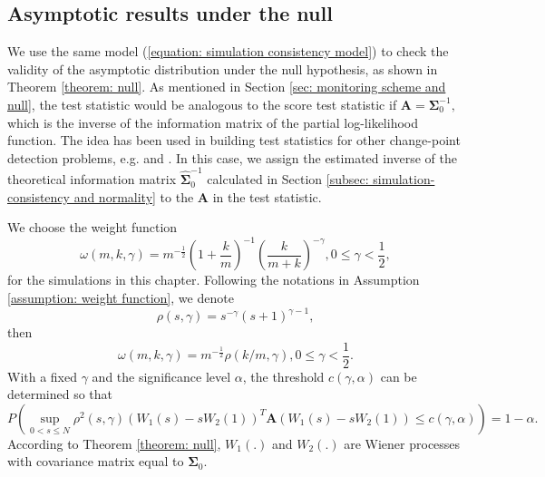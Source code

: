 \documentclass{article}
\theoremstyle{definition}
\begin{document}
\subsection{Asymptotic results under the null}
\label{sec: asymptotic results under the null}
We use the same model (\ref{equation: simulation consistency model}) to check the validity of the asymptotic distribution under the null hypothesis, as shown in Theorem \ref{theorem: null}. As mentioned in Section \ref{sec: monitoring scheme and null}, the test statistic would be analogous to the score test statistic if $\bm{A} = \bm{\Sigma}^{-1}_0,$ which is the inverse of the information matrix of the partial log-likelihood function. The idea has been used in building test statistics for other change-point detection problems, e.g. \cite{huvskova2005monitoring} and \cite{hudecova2013structural}. In this case, we assign the estimated inverse of the theoretical information matrix $\hat{\bm{\Sigma}}^{-1}_0$ calculated in Section \ref{subsec: simulation-consistency and normality} to the $\bm{A}$ in the test statistic. 

We choose the weight function 
\begin{equation}
    \label{eq: definition of the weight function}
    \omega(m,k, \gamma) = m^{-\frac{1}{2}}(1+\frac{k}{m})^{-1}(\frac{k}{m+k})^{-\gamma}, 0\leq \gamma< \frac{1}{2},
\end{equation}
for the simulations in this chapter. Following the notations in Assumption \ref{assumption: weight function}, we denote 
\begin{equation*}
    \rho(s,\gamma) = s^{-\gamma}(s+1)^{\gamma-1},
\end{equation*}
then 
\begin{equation*}
    \omega(m,k, \gamma) = m^{-\frac{1}{2}}\rho(k/m, \gamma), 0\leq \gamma< \frac{1}{2}.
\end{equation*}
With a fixed $\gamma$ and the significance level $\alpha$, the threshold $c(\gamma,\alpha)$ can be determined so that
$$P(\underset{0< s \leq N}{\sup}\rho^2(s,\gamma)(W_1(s)-sW_2(1))^T\bm{A}(W_1(s)-sW_2(1))\leq c(\gamma,\alpha)) = 1-\alpha.$$
According to Theorem \ref{theorem: null}, $W_1(.)$ and $W_2(.)$ are Wiener processes with covariance matrix equal to $\bm{\Sigma}_0$.
\end{document}

